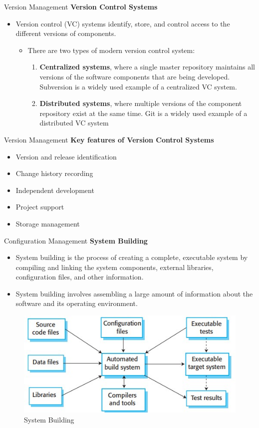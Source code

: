\documentclass{beamer}
\begin{document}
\begin{frame}{Version Management}
	\textbf{Version Control Systems}
	\begin{itemize}
		\item Version control (VC) systems identify, store, and control access to the different versions of components.
		\begin{itemize}
			\item There are two types of modern version control system:
			\begin{enumerate}
				\item  \textbf{Centralized systems}, where a single master repository maintains all versions of the software 
				components that are being developed. Subversion is a widely used example of a centralized VC system.
				\item \textbf{Distributed systems}, where multiple versions of the component repository exist at the same time. Git is 
				a widely used example of a distributed VC system
			\end{enumerate}
		\end{itemize}
	\end{itemize}
\end{frame}
\begin{frame}{Version Management}
	\textbf{Key features of Version Control Systems}
	\begin{itemize}
		\item Version and release identification
		\item Change history recording
		\item Independent development
		\item Project support
		\item Storage management
		\end{itemize}
\end{frame}
\begin{frame}{Configuration Management}
	\textbf{System Building}
	\begin{itemize}
		\item System building is the process of creating a complete, executable system by compiling and linking the 
		system components, external libraries, configuration files, and other information.
	\item System building involves assembling a large amount of information about the software and its 
		operating environment.

	\end{itemize}
\begin{figure}
	\includegraphics[scale=.5]{img/m4_12}
	\caption{System Building}
\end{figure}
\end{frame}
\end{document}
